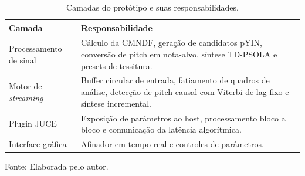 \begin{table}[H]
\centering
\caption{\label{tab:arquitetura_camadas}Camadas do protótipo e suas responsabilidades.}
\small
\begin{tabular}{|p{4.0cm}|p{10.5cm}|}
\hline
\textbf{Camada} & \textbf{Responsabilidade} \\
\hline
Processamento de sinal & Cálculo da CMNDF, geração de candidatos pYIN, conversão de pitch em nota-alvo, síntese TD-PSOLA e presets de tessitura. \\
\hline
Motor de \textit{streaming} & Buffer circular de entrada, fatiamento de quadros de análise, detecção de pitch causal com Viterbi de lag fixo e síntese incremental. \\
\hline
Plugin JUCE & Exposição de parâmetros ao host, processamento bloco a bloco e comunicação da latência algorítmica. \\
\hline
Interface gráfica & Afinador em tempo real e controles de parâmetros. \\
\hline
\end{tabular}
\small Fonte: Elaborada pelo autor.
\end{table}

